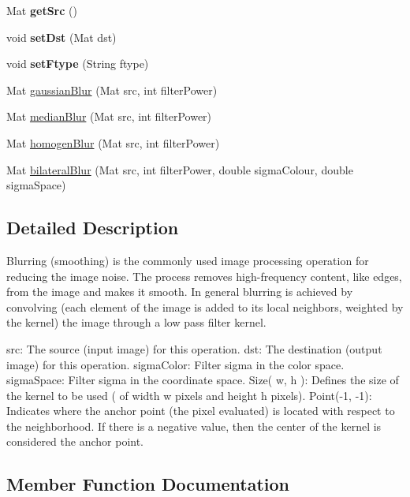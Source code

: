 \begin{DoxyCompactItemize}
Mat {\bfseries get\+Src} ()
\item 
\mbox{\label{classapplication_1_1_blur_a0bab9619fb6330aa2026f006de3f2257}} 
void {\bfseries set\+Dst} (Mat dst)
\item 
\mbox{\label{classapplication_1_1_blur_a5c8e0528528b0b0dda9aaf9b0980e848}} 
void {\bfseries set\+Ftype} (String ftype)
\item 
Mat \mbox{\hyperlink{classapplication_1_1_blur_a445cba49c071e6a84b9ae6d56f208f60}{gaussian\+Blur}} (Mat src, int filter\+Power)
\item 
Mat \mbox{\hyperlink{classapplication_1_1_blur_a070e2c5803f62149b71ae9bc867a44da}{median\+Blur}} (Mat src, int filter\+Power)
\item 
Mat \mbox{\hyperlink{classapplication_1_1_blur_aa26cb7151a1acda73884d3fb9479e971}{homogen\+Blur}} (Mat src, int filter\+Power)
\item 
Mat \mbox{\hyperlink{classapplication_1_1_blur_af85191ef064d33c47886bc17d6af9ebe}{bilateral\+Blur}} (Mat src, int filter\+Power, double sigma\+Colour, double sigma\+Space)
\end{DoxyCompactItemize}


\subsection{Detailed Description}
Blurring (smoothing) is the commonly used image processing operation for reducing the image noise. The process removes high-\/frequency content, like edges, from the image and makes it smooth. In general blurring is achieved by convolving (each element of the image is added to its local neighbors, weighted by the kernel) the image through a low pass filter kernel.

src\+: The source (input image) for this operation. dst\+: The destination (output image) for this operation. sigma\+Color\+: Filter sigma in the color space. sigma\+Space\+: Filter sigma in the coordinate space. Size( w, h )\+: Defines the size of the kernel to be used ( of width w pixels and height h pixels). Point(-\/1, -\/1)\+: Indicates where the anchor point (the pixel evaluated) is located with respect to the neighborhood. If there is a negative value, then the center of the kernel is considered the anchor point. 

\subsection{Member Function Documentation}
\mbox{\label{classapplication_1_1_blur_af85191ef064d33c47886bc17d6af9ebe}} 

